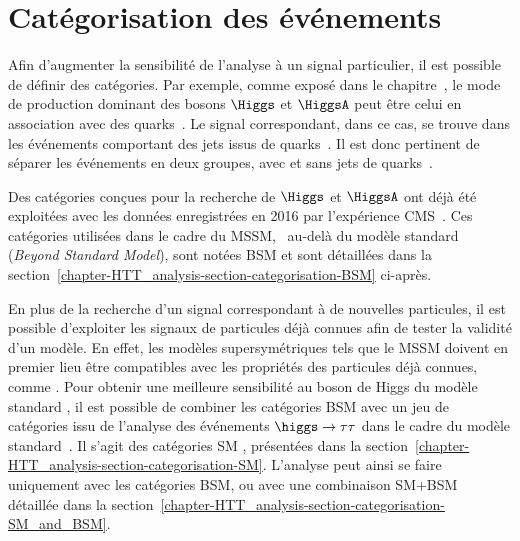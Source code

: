 \section{Catégorisation des événements}\label{chapter-HTT_analysis-section-categorisation}
Afin d'augmenter la sensibilité de l'analyse à un signal particulier, il est possible de définir des catégories.
Par exemple, comme exposé dans le chapitre~, le mode de production dominant des bosons $\Higgs$ et $\HiggsA$ peut être celui en association avec des quarks~\quarkb.
Le signal correspondant, dans ce cas, se trouve dans les événements comportant des jets issus de quarks~\quarkb.
Il est donc pertinent de séparer les événements en deux groupes, avec et sans jets de quarks~\quarkb.
\par
Des catégories conçues pour la recherche de $\Higgs$ et $\HiggsA$ ont déjà été exploitées avec les données enregistrées en 2016 par l'expérience CMS~\cite{CMS-PAS-HIG-17-020}.
Ces catégories utilisées dans le cadre du MSSM, \ie\ au-delà du modèle standard (\emph{Beyond Standard Model}), sont notées \og BSM \fg{} et sont détaillées dans la section~\ref{chapter-HTT_analysis-section-categorisation-BSM} ci-après.
\par
En plus de la recherche d'un signal correspondant à de nouvelles particules, il est possible d'exploiter les signaux de particules déjà connues afin de tester la validité d'un modèle.
En effet, les modèles supersymétriques tels que le MSSM doivent en premier lieu être compatibles avec les propriétés des particules déjà connues, comme \higgs.
Pour obtenir une meilleure sensibilité au boson de Higgs du modèle standard \higgs, il est possible de combiner les catégories BSM avec un jeu de catégories issu de l'analyse des événements $\higgs\to\tau\tau$ dans le cadre du modèle standard~\cite{CMS-PAS-HIG-19-010}.
Il s'agit des catégories \og SM \fg, présentées dans la section~\ref{chapter-HTT_analysis-section-categorisation-SM}.
L'analyse peut ainsi se faire uniquement avec les catégories BSM, ou avec une combinaison SM+BSM détaillée dans la section~\ref{chapter-HTT_analysis-section-categorisation-SM_and_BSM}.



